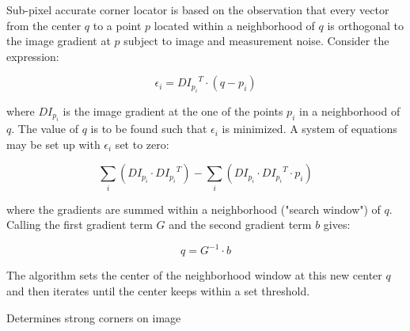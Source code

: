Sub-pixel accurate corner locator is based on the observation that every vector from the center $q$ to a point $p$ located within a neighborhood of $q$ is orthogonal to the image gradient at $p$ subject to image and measurement noise. Consider the expression:

\[
\epsilon_i = {DI_{p_i}}^T \cdot (q - p_i)
\]

where ${DI_{p_i}}$ is the image gradient at the one of the points $p_i$ in a neighborhood of $q$. The value of $q$ is to be found such that $\epsilon_i$ is minimized. A system of equations may be set up with $\epsilon_i$ set to zero:

\[
\sum_i(DI_{p_i} \cdot {DI_{p_i}}^T) - \sum_i(DI_{p_i} \cdot {DI_{p_i}}^T \cdot p_i)
\]

where the gradients are summed within a neighborhood ("search window") of $q$. Calling the first gradient term $G$ and the second gradient term $b$ gives:

\[
q = G^{-1} \cdot b
\]

The algorithm sets the center of the neighborhood window at this new center $q$ and then iterates until the center keeps within a set threshold.

\label{GoodFeaturesToTrack}
Determines strong corners on image


